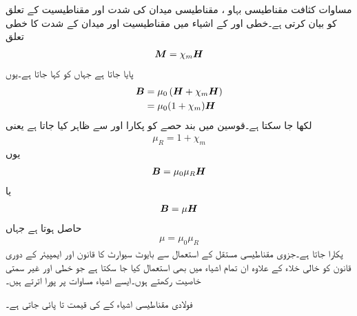 مساوات  کثافت مقناطیسی  بہاو ، مقناطیسی میدان کی شدت  اور مقناطیسیت  کے تعلق کو بیان کرتی ہے۔خطی اور  کے اشیاء  میں مقناطیسیت اور میدان کے شدت کا خطی تعلق
\begin{align}\label{مساوات_امالہ_خطی_ہم_سمتی_اشیاء_تعلق}
{\ensuremath{{\boldsymbol{M}}}}=\chi_m {{\boldsymbol{H}}}
\end{align}
پایا جاتا ہے  جہاں  کو  کہا جاتا ہے۔یوں
\begin{align*}
{\ensuremath{{\boldsymbol{B}}}}&=\mu_0\left({{\boldsymbol{H}}}+\chi_m {{\boldsymbol{H}}} \right)\\
&=\mu_0 (1+\chi_m){{\boldsymbol{H}}}
\end{align*}
لکھا جا سکتا ہے۔قوسین میں بند حصے کو  پکارا اور  سے ظاہر کیا جاتا ہے یعنی
\begin{align}
\mu_R=1+\chi_m
\end{align}
یوں
\begin{align*}
{\ensuremath{{\boldsymbol{B}}}}=\mu_0 \mu_R {{\boldsymbol{H}}}
\end{align*}
یا
\begin{align}
{\ensuremath{{\boldsymbol{B}}}}=\mu {\ensuremath{{\boldsymbol{H}}}}
\end{align}
حاصل ہوتا ہے جہاں 
\begin{align}
\mu=\mu_0 \mu_R
\end{align}
 پکارا جاتا ہے۔جزوی مقناطیسی مستقل  کے استعمال سے بایوٹ سیوارٹ کا قانون اور ایمپیئر کے دوری قانون کو خالی خلاء کے علاوہ ان تمام اشیاء میں بھی استعمال کیا جا سکتا ہے جو خطی اور غیر سمتی خاصیت رکھتے ہوں۔ایسے اشیاء مساوات  پر پورا اترتے ہیں۔

فولادی مقناطیسی اشیاء کے  کی قیمت  تا  پائی جاتی ہے۔

